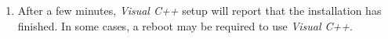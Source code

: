 \begin{enumerate}
	\item After a few minutes, \emph{Visual C++} setup will report that the installation has finished. %
		In some cases, a reboot may be required to use \emph{Visual C++}.


\end{enumerate}

